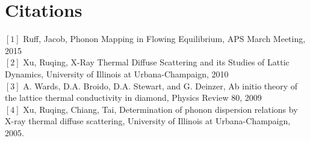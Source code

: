 \documentclass[aip,jap,12 pt,preprint]{revtex4-1}
\begin{document}
\section{\label{sec:level1} Citations}
$[1]$ Ruff, Jacob, Phonon Mapping in Flowing Equilibrium, APS March Meeting, 2015 \\
$[2]$ Xu, Ruqing, X-Ray Thermal Diffuse Scattering and its Studies of Lattic Dynamics, University of Illinois at Urbana-Champaign, 2010\\
$[3]$ A. Wards, D.A. Broido, D.A. Stewart, and G. Deinzer, Ab initio theory of the lattice thermal conductivity in diamond, Physics Review 80, 2009\\
$[4]$ Xu, Ruqing, Chiang, Tai, Determination of phonon dispersion relations by X-ray thermal diffuse scattering, University of Illinois at Urbana-Champaign, 2005.\\
\end{document}
